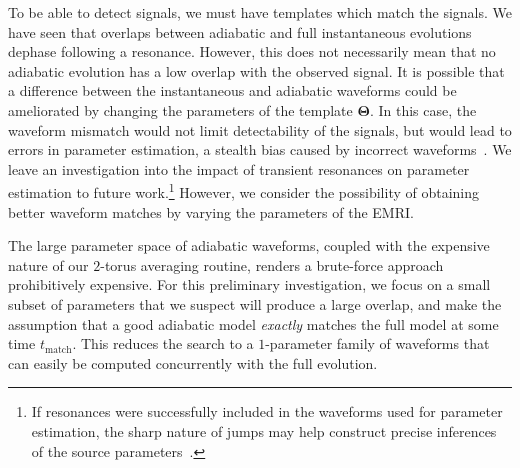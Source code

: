 \documentclass[aps,prd,amsfonts,amssymb,amsmath,nofootinbib,showpacs,superscriptaddress,twocolumn,floatfix]{revtex4-1}
\newcommand{\sub}[1]{\ensuremath{_\mathrm{#1}}}
\begin{document}
To be able to detect signals, we must have templates which match the signals. We have seen that overlaps between adiabatic and full instantaneous evolutions dephase following a resonance. However, this does not necessarily mean that no adiabatic evolution has a low overlap with the observed signal. It is possible that a difference between the instantaneous and adiabatic waveforms could be ameliorated by changing the parameters of the template $\boldsymbol{\Theta}$. In this case, the waveform mismatch would not limit detectability of the signals, but would lead to errors in parameter estimation, a stealth bias caused by incorrect waveforms~\cite{Cutler2007}. We leave an investigation into the impact of transient resonances on parameter estimation to future work.\footnote{If resonances were successfully included in the waveforms used for parameter estimation, the sharp nature of jumps may help construct precise inferences of the source parameters~\cite{Mandel2014}.} However, we consider the possibility of obtaining better waveform matches by varying the parameters of the EMRI.

The large parameter space of adiabatic waveforms, coupled with the expensive nature of our $2$-torus averaging routine, renders a brute-force approach prohibitively expensive. For this preliminary investigation, we focus on a small subset of parameters that we suspect will produce a large overlap, and make the assumption that a good adiabatic model \emph{exactly} matches the full model at some time $t\sub{match}$. This reduces the search to a $1$-parameter family of waveforms that can easily be computed concurrently with the full evolution.

\end{document}

